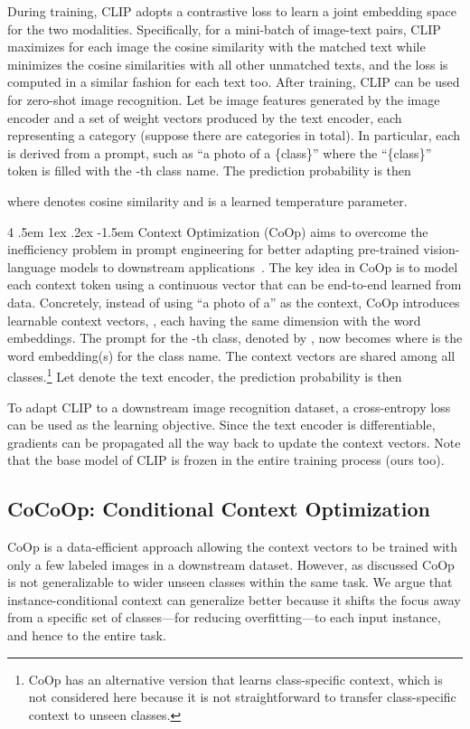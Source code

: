 \documentclass[10pt,twocolumn,letterpaper]{article}
\makeatletter
\renewcommand\paragraph{
  \@startsection{paragraph} {4} {\z@} {.5em \@plus1ex \@minus.2ex} {-1.5em} {\normalfont\normalsize\bfseries} }
\makeatother
\begin{document}
During training, CLIP adopts a contrastive loss to learn a joint embedding space for the two modalities. Specifically, for a mini-batch of image-text pairs, CLIP maximizes for each image the cosine similarity with the matched text while minimizes the cosine similarities with all other unmatched texts, and the loss is computed in a similar fashion for each text too. After training, CLIP can be used for zero-shot image recognition. Let  be image features generated by the image encoder and  a set of weight vectors produced by the text encoder, each representing a category (suppose there are  categories in total). In particular, each  is derived from a prompt, such as ``a photo of a \{class\}'' where the ``\{class\}'' token is filled with the -th class name. The prediction probability is then

where  denotes cosine similarity and  is a learned temperature parameter.

\paragraph{Context Optimization (CoOp)}
aims to overcome the inefficiency problem in prompt engineering for better adapting pre-trained vision-language models to downstream applications~\cite{zhou2021coop}. The key idea in CoOp is to model each context token using a continuous vector that can be end-to-end learned from data. Concretely, instead of using ``a photo of a'' as the context, CoOp introduces  learnable context vectors, , each having the same dimension with the word embeddings. The prompt for the -th class, denoted by , now becomes  where  is the word embedding(s) for the class name. The context vectors are shared among all classes.\footnote{CoOp has an alternative version that learns class-specific context, which is not considered here because it is not straightforward to transfer class-specific context to unseen classes.} Let  denote the text encoder, the prediction probability is then


To adapt CLIP to a downstream image recognition dataset, a cross-entropy loss can be used as the learning objective. Since the text encoder  is differentiable, gradients can be propagated all the way back to update the context vectors. Note that the base model of CLIP is frozen in the entire training process (ours too).

\subsection{CoCoOp: Conditional Context Optimization}
CoOp is a data-efficient approach allowing the context vectors to be trained with only a few labeled images in a downstream dataset. However, as discussed CoOp is not generalizable to wider unseen classes within the same task. We argue that instance-conditional context can generalize better because it shifts the focus away from a specific set of classes---for reducing overfitting---to each input instance, and hence to the entire task.
\end{document}
